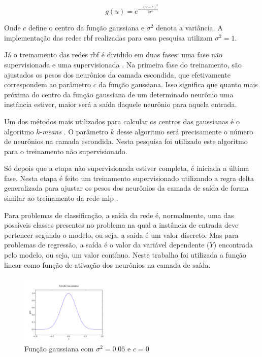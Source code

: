\documentclass[conference]{IEEEtran}
\begin{document}
$$g(u) = e^{-\frac{(u-c)^{2}}{2\sigma^{2}}}$$

Onde $c$ define o centro da função gaussiana e $\sigma^{2}$ denota a variância.
A implementação das redes \ac*{rbf} realizadas para essa pesquisa utilizam 
$\sigma^{2} = 1$.

Já o treinamento das redes \ac*{rbf} é dividido em duas fases: uma fase não 
supervisionada e uma supervisionada \cite{daredes}. Na primeira fase do 
treinamento, são ajustados os pesos dos neurônios da camada escondida, que 
efetivamente correspondem ao parâmetro $c$ da função gaussiana. Isso significa 
que quanto mais próxima do centro da função gaussiana de um determinado neurônio 
uma instância estiver, maior será a saída daquele neurônio para aquela entrada.

Um dos métodos mais utilizados para calcular os centros das gaussianas é o 
algoritmo $k$-\textit{means} \cite{daredes}. O parâmetro $k$ desse algoritmo 
será precisamente o número de neurônios na camada escondida. Nesta pesquisa 
foi utilizado este algoritmo para o treinamento não supervisionado.

Só depois que a etapa não supervisionada estiver completa, é iniciada a última 
fase. Nesta etapa é feito um treinamento supervisionado utilizando a regra delta 
generalizada para ajustar os pesos dos neurônios da camada de saída de forma 
similar ao treinamento da rede \ac*{mlp} \cite{daredes}.

Para problemas de classificação, a saída da rede é, normalmente, uma das 
possíveis classes presentes no problema na qual a instância de entrada deve 
pertencer segundo o modelo, ou seja, a saída é um valor discreto. Mas para 
problemas de regressão, a saída é o valor da variável dependente ($Y$) 
encontrada pelo modelo, ou seja, um valor contínuo. Neste trabalho foi 
utilizada a função linear como função de ativação dos neurônios na camada de 
saída.

\begin{figure}[t]
	\caption{Função gaussiana com $\sigma^{2} = 0.05$ e $c = 0$}
	\label{fig:gaussian}
	\centering
	\includegraphics[width=0.40\textwidth]{gaussian}
\end{figure}
\end{document}
